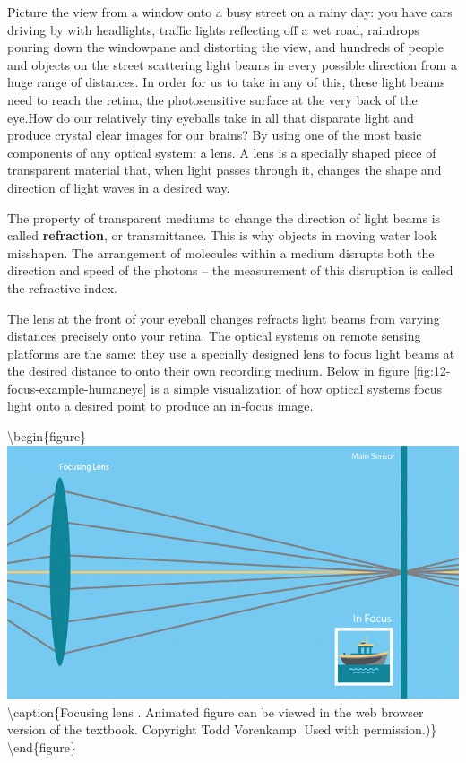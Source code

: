 \documentclass[
]{book}
\begin{document}
Picture the view from a window onto a busy street on a rainy day: you have cars driving by with headlights, traffic lights reflecting off a wet road, raindrops pouring down the windowpane and distorting the view, and hundreds of people and objects on the street scattering light beams in every possible direction from a huge range of distances. In order for us to take in any of this, these light beams need to reach the retina, the photosensitive surface at the very back of the eye.How do our relatively tiny eyeballs take in all that disparate light and produce crystal clear images for our brains? By using one of the most basic components of any optical system: a lens. A lens is a specially shaped piece of transparent material that, when light passes through it, changes the shape and direction of light waves in a desired way.

The property of transparent mediums to change the direction of light beams is called \textbf{refraction}, or transmittance. This is why objects in moving water look misshapen. The arrangement of molecules within a medium disrupts both the direction and speed of the photons -- the measurement of this disruption is called the refractive index.

The lens at the front of your eyeball changes refracts light beams from varying distances precisely onto your retina. The optical systems on remote sensing platforms are the same: they use a specially designed lens to focus light beams at the desired distance to onto their own recording medium. Below in figure \ref{fig:12-focus-example-humaneye} is a simple visualization of how optical systems focus light onto a desired point to produce an in-focus image.

\textbackslash begin\{figure\}
\includegraphics[width=0.9\linewidth]{images/12-focus_example_humaneye} \textbackslash caption\{Focusing lens \citep{vorenkamp_how_2015}. Animated figure can be viewed in the web browser version of the textbook. Copyright Todd Vorenkamp. Used with permission.)\}\label{fig:12-focus-example-humaneye}
\textbackslash end\{figure\}
\end{document}
